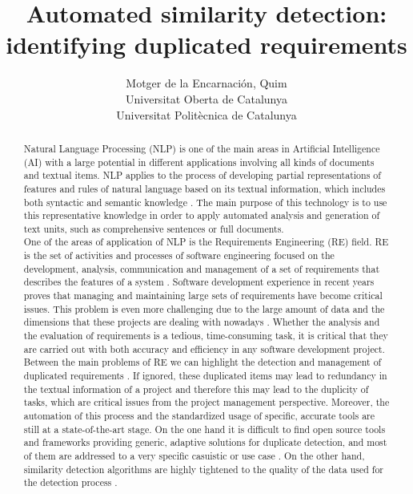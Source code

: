 \documentclass[a4paper]{article}
\title{Automated similarity detection: \\ identifying duplicated requirements}
\author{Motger de la Encarnación, Quim  \\
        \small Universitat Oberta de Catalunya \\
        \small Universitat Politècnica de Catalunya\\
}
\date{} %
\begin{document}
\maketitle

\begin{abstract}
Natural Language Processing (NLP) is one of the main areas in Artificial Intelligence (AI) with a large potential in different applications involving all kinds of documents and textual items. NLP applies to the process of developing partial representations of features and rules of natural language based on its textual information, which includes both syntactic and semantic knowledge \cite{b1}.  The main purpose of this technology is to use this representative knowledge in order to apply automated analysis and generation of text units, such as comprehensive sentences or full documents. \\

One of the areas of application of NLP is the Requirements Engineering (RE) field. RE is the set of activities and processes of software engineering focused on the development, analysis, communication and management of a set of requirements that describes the features of a system \cite{b2}. Software development experience in recent years proves that managing and maintaining large sets of requirements have become critical issues. This problem is even more challenging due to the large amount of data and the dimensions that these projects are dealing with nowadays \cite{b3}. Whether the analysis and the evaluation of requirements is a tedious, time-consuming task,  it is critical that they are carried out with both accuracy and efficiency in any software development project. \\

Between the main problems of RE we can highlight the detection and management of duplicated requirements \cite{b4}. If ignored, these duplicated items may lead to redundancy in the textual information of a project and therefore this may lead to the duplicity of tasks, which are critical issues from the project management perspective. Moreover, the automation of this process and the standardized usage of specific, accurate tools are still at a state-of-the-art stage. On the one hand it is difficult to find open source tools and frameworks providing generic, adaptive solutions for duplicate detection, and most of them are addressed to a very specific casuistic or use case \cite{b5}. On the other hand, similarity detection algorithms are highly tightened to the quality of the data used for the detection process \cite{b6}. \\


\end{abstract}
\end{document}
